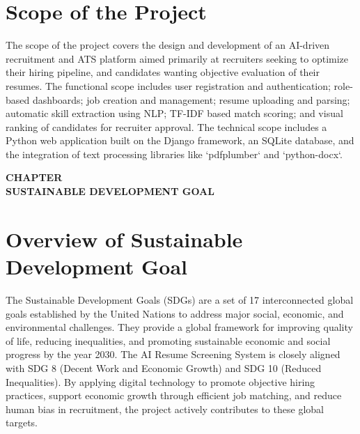\documentclass[12pt,a4paper]{report}
\newcommand{\chaptertitlepage}[1]{%
\cleardoublepage
\thispagestyle{empty}
\null
\vfill
\begin{center}
{\fontsize{16pt}{18pt}\selectfont\bfseries
CHAPTER \thechapter}\\[0.5cm]
{\fontsize{16pt}{18pt}\selectfont\bfseries
#1}
\end{center}
\vfill
\null
\clearpage
}
\begin{document}
\section{Scope of the Project}
\noindent The scope of the project covers the design and development of an AI-driven recruitment and ATS platform aimed primarily at recruiters seeking to optimize their hiring pipeline, and candidates wanting objective evaluation of their resumes. The functional scope includes user registration and authentication; role-based dashboards; job creation and management; resume uploading and parsing; automatic skill extraction using NLP; TF-IDF based match scoring; and visual ranking of candidates for recruiter approval. The technical scope includes a Python web application built on the Django framework, an SQLite database, and the integration of text processing libraries like `pdfplumber` and `python-docx`.

\chaptertitlepage{SUSTAINABLE DEVELOPMENT GOAL}
\section{Overview of Sustainable Development Goal}
The Sustainable Development Goals (SDGs) are a set of 17 interconnected global goals established by the United Nations to address major social, economic, and environmental challenges. They provide a global framework for improving quality of life, reducing inequalities, and promoting sustainable economic and social progress by the year 2030. The AI Resume Screening System is closely aligned with SDG 8 (Decent Work and Economic Growth) and SDG 10 (Reduced Inequalities). By applying digital technology to promote objective hiring practices, support economic growth through efficient job matching, and reduce human bias in recruitment, the project actively contributes to these global targets.
\end{document}
